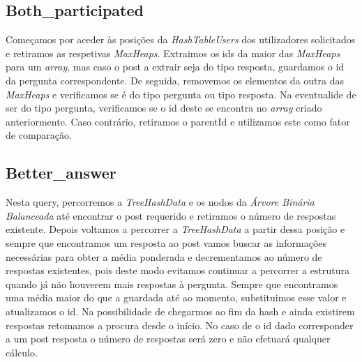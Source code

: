 \documentclass[10pt,a4paper]{article}
\begin{document}
{\subsection{Both\_participated} 
Começamos por aceder às posições da \textit{HashTableUsers} dos utilizadores solicitados e retiramos as respetivas \textit{MaxHeaps}. Extraimos os ids da maior das \textit{MaxHeaps} para um \textit{array}, mas caso o post a extrair seja do tipo resposta, guardamos o id da pergunta correspondente. De seguida, removemos os elementos da outra das \textit{MaxHeaps} e verificamos se é do tipo pergunta ou tipo resposta. Na eventualide de ser do tipo pergunta, verificamos se o id deste se encontra no \textit{array} criado anteriormente. Caso contrário, retiramos o parentId e utilizamos este como fator de comparação.

\subsection{Better\_answer} 
Nesta query, percorremos a \textit{TreeHashData} e os nodos da \textit{Árvore Binária Balanceada} até encontrar o post requerido e retiramos o número de respostas existente. Depois voltamos a percorrer a \textit{TreeHashData} a partir dessa posição e sempre que encontramos um resposta ao post vamos buscar as informações necessárias para obter a média ponderada e decrementamos ao número de respostas existentes, pois deste modo evitamos continuar a percorrer a estrutura quando já não houverem mais respostas à pergunta. Sempre que encontramos uma média maior do que a guardada até ao momento, substituimos esse valor e atualizamos o id. Na possibilidade de chegarmos ao fim da hash e ainda existirem respostas retomamos a procura desde o início. No caso de o id dado corresponder a um post resposta o número de respostas será zero e não efetuará qualquer cálculo. 

}
\end{document}
